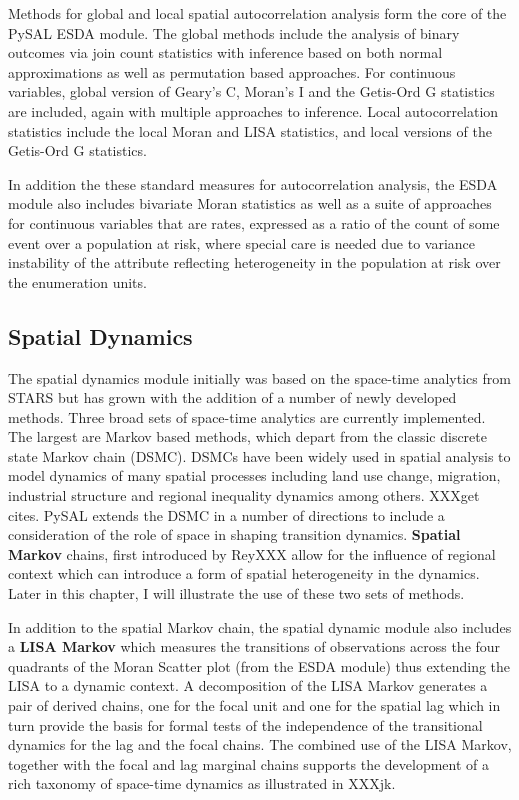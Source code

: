 \documentclass[11pt, titlepage]{article}
\begin{document}
Methods for global and local spatial autocorrelation analysis form the
core of the PySAL ESDA module. The global methods include the analysis
of binary outcomes via join count statistics with inference based on
both normal approximations as well as permutation based approaches. For
continuous variables, global version of Geary's C, Moran's I and the
Getis-Ord G statistics are included, again with multiple approaches to
inference. Local autocorrelation statistics include the local Moran and
LISA statistics, and local versions of the Getis-Ord G statistics.

In addition the these standard measures for autocorrelation analysis,
the ESDA module also includes bivariate Moran statistics as well as a
suite of approaches for continuous variables that are rates, expressed
as a ratio of the count of some event over a population at risk, where
special care is needed due to variance instability of the attribute
reflecting heterogeneity in the population at risk over the enumeration
units.

\subsection{Spatial Dynamics}

The spatial dynamics module initially was based on the space-time
analytics from STARS but has grown with the addition of a number of
newly developed methods. Three broad sets of space-time analytics are
currently implemented. The largest are Markov based methods, which
depart from the classic discrete state Markov chain (DSMC). DSMCs have
been widely used in spatial analysis to model dynamics of many spatial
processes including land use change, migration, industrial structure and
regional inequality dynamics among others. XXXget cites. PySAL extends
the DSMC in a number of directions to include a consideration of the
role of space in shaping transition dynamics. \textbf{Spatial Markov}
chains, first introduced by ReyXXX allow for the influence of regional
context which can introduce a form of spatial heterogeneity in the
dynamics. Later in this chapter, I will illustrate the use of these two
sets of methods.

In addition to the spatial Markov chain, the spatial dynamic module also
includes a \textbf{LISA Markov} which measures the transitions of
observations across the four quadrants of the Moran Scatter plot (from
the ESDA module) thus extending the LISA to a dynamic context. A
decomposition of the LISA Markov generates a pair of derived chains, one
for the focal unit and one for the spatial lag which in turn provide the
basis for formal tests of the independence of the transitional dynamics
for the lag and the focal chains. The combined use of the LISA Markov,
together with the focal and lag marginal chains supports the development
of a rich taxonomy of space-time dynamics as illustrated in XXXjk.
\end{document}
